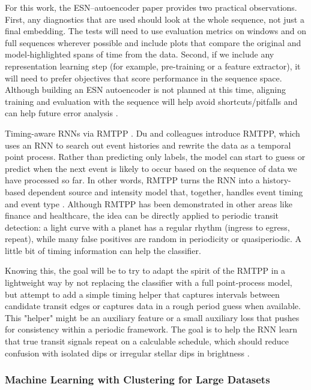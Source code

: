 \documentclass[letterpaper]{article} %
\begin{document}
For this work, the ESN–autoencoder paper provides two practical observations. First, any diagnostics that are used should look at the whole sequence, not just a final embedding. The tests will need to use evaluation metrics on windows and on full sequences wherever possible and include plots that compare the original and model‑highlighted spans of time from the data. Second, if we include any representation learning step (for example, pre-training or a feature extractor), it will need to prefer objectives that score performance in the sequence space. Although building an ESN autoencoder is not planned at this time, aligning training and evaluation with the sequence will help avoid shortcuts/pitfalls and can help future error analysis \cite{kugler2016explorativeapproachkepler}.

Timing-aware RNNs via RMTPP \cite{Du2016markedtemporalpoint}. Du and colleagues introduce RMTPP, which uses an RNN to search out event histories and rewrite the data as a temporal point process. Rather than predicting only labels, the model can start to guess or predict when the next event is likely to occur based on the sequence of data we have processed so far. In other words, RMTPP turns the RNN into a history-based dependent source and intensity model that, together, handles event timing and event type \cite{Du2016markedtemporalpoint}. Although RMTPP has been demonstrated in other areas like finance and healthcare, the idea can be directly applied to periodic transit detection: a light curve with a planet has a regular rhythm (ingress to egress, repeat), while many false positives are random in periodicity or quasiperiodic. A little bit of timing information can help the classifier.

Knowing this, the goal will be to try to adapt the spirit of the RMTPP in a lightweight way by not replacing the classifier with a full point‑process model, but attempt to add a simple timing helper that captures intervals between candidate transit edges or captures data in a rough period guess when available. This "helper" might be an auxiliary feature or a small auxiliary loss that pushes for consistency within a periodic framework. The goal is to help the RNN learn that true transit signals repeat on a calculable schedule, which should reduce confusion with isolated dips or irregular stellar dips in brightness \cite{Du2016markedtemporalpoint}.

\subsubsection{Machine Learning with Clustering for Large Datasets}
\end{document}
